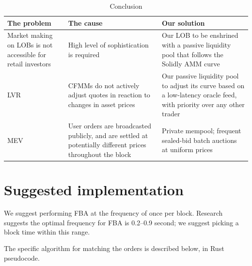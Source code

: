 \documentclass{article}
\begin{document}
\begin{table}
  \tabulinesep=2.5mm
  \begin{tabu} to \textwidth {YYY}
    \toprule
    \textbf{The problem}                                                                                       & \textbf{The cause} & \textbf{Our solution} \\
    \midrule
    Market making on LOBs is not accessible for retail investors                                               &
    High level of sophistication is required                                                                   &
    Our LOB to be enshrined with a passive liquidity pool that follows the Solidly AMM curve                                                                \\
    \hline
    LVR                                                                                                        &
    CFMMs do not actively adjust quotes in reaction to changes in asset prices                                 &
    Our passive liquidity pool to adjust its curve based on a low-latency oracle feed, with priority over any other trader                                  \\
    \hline
    MEV                                                                                                        &
    User orders are broadcasted publicly, and are settled at potentially different prices throughout the block &
    Private mempool; frequent sealed-bid batch auctions at uniform prices                                                                                   \\
    \bottomrule
  \end{tabu}
  \vspace*{0.1in}
  \caption{Conclusion}
  \label{tab:conclusion}
\end{table}

\appendix
\section{Suggested implementation}
\label{sec:appendixa}

We suggest performing FBA at the frequency of once per block. Research suggests the optimal frequency for FBA is 0.2--0.9 second;\supercite{optimalspeed} we suggest picking a block time within this range.

The specific algorithm for matching the orders is described below, in Rust pseudocode.
\end{document}
